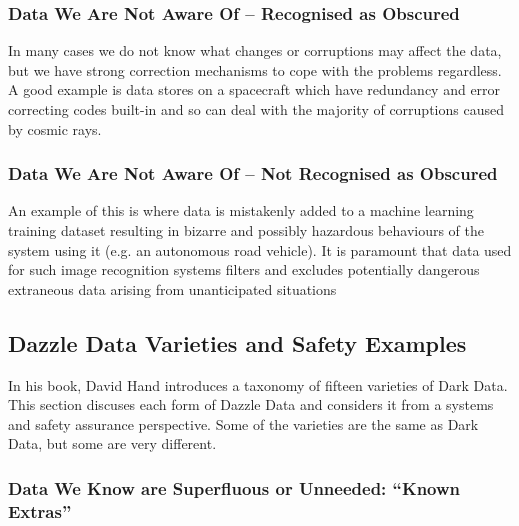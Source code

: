 \subsubsection{Data We Are Not Aware Of -- Recognised as Obscured}
In many cases we do not know what changes or corruptions may affect the data, but we have strong correction mechanisms to cope with the problems regardless. A good example is data stores on a spacecraft which have redundancy and error correcting codes built-in and so can deal with the majority of corruptions caused by cosmic rays.

\subsubsection{Data We Are Not Aware Of -- Not Recognised as Obscured}
An example of this is where data is mistakenly added to a machine learning training \gls{dataset} resulting in bizarre and possibly hazardous behaviours of the system using it (e.g. an autonomous road vehicle). It is paramount that data used for such image recognition systems filters and excludes potentially dangerous extraneous data arising from unanticipated situations 

\subsection{Dazzle Data Varieties and Safety Examples}
In his book, David Hand introduces a taxonomy of fifteen varieties of Dark Data. This section discuses each form of Dazzle Data and considers it from a systems and safety assurance perspective.
Some of the varieties are the same as Dark Data, but some are very different.

\subsubsection{Data We Know are Superfluous or Unneeded: ``Known Extras''}
\label{bkm:dazzledata:case1}

